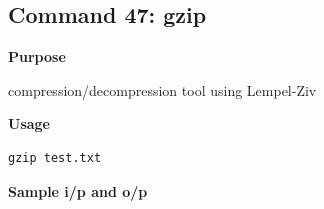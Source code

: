 \subsection{Command 47: gzip} 
\textbf{Purpose}
\begin{flushleft}
 compression/decompression tool using Lempel-Ziv
\end{flushleft}
\textbf{Usage}
\begin{verbatim}
gzip test.txt
\end{verbatim}
\textbf{Sample i/p and o/p}
\begin{figure}[H] 
\end{figure}
